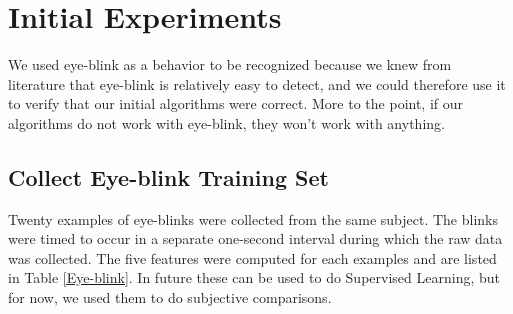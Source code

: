 \documentclass[11pt]{amsart}
\begin{document}
\section{Initial Experiments}
We used eye-blink as a behavior to be recognized because we knew from literature that eye-blink is relatively easy to detect, and we could therefore use it to verify that our initial algorithms were correct. More to the point, if our algorithms do not work with eye-blink, they won't work with anything.

\subsection{Collect Eye-blink Training Set}
Twenty examples of eye-blinks were collected from the same subject. The blinks were timed to occur in a  separate one-second interval during which the raw data was collected. The five features were computed for each examples and are listed in Table \ref{Eye-blink}. In future these can be used to do Supervised Learning, but for now, we used them to do subjective comparisons. 
\end{document}
